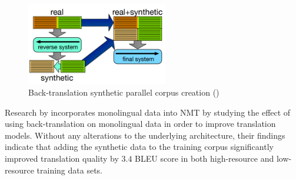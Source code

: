\begin{figure}[ht!]
\centering
\includegraphics[width=0.55\textwidth]{media/literature/data_argumentation/da_back_trans.png}
\caption[Diagram of the back-translation synthetic parallel corpus]{Back-translation synthetic parallel corpus creation (\cite{hoang_iterative_2018})}
\label{fig:back_trans}
\end{figure}
Research by \cite{sennrich_improving_2016} incorporates monolingual data into \acrshort{NMT} by studying the effect of using back-translation on monolingual data in order to improve translation models.  Without any alterations to the underlying architecture, their findings indicate that adding the synthetic data to the training corpus significantly improved translation quality by $3.4$ BLEU score in both high-resource and low-resource training data sets.








